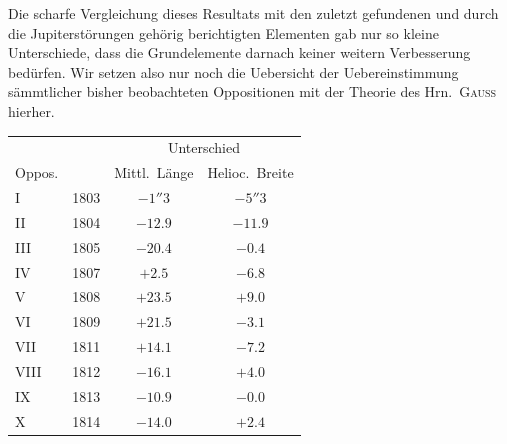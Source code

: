\par\indent Die scharfe Vergleichung dieses Resultats mit den zuletzt gefundenen und durch die Jupiterstörungen gehörig berichtigten Elementen gab nur so kleine Unterschiede, dass die Grundelemente darnach keiner weitern Verbesserung bedürfen. Wir setzen also nur noch die Uebersicht der Uebereinstimmung sämmtlicher bisher beobachteten Oppositionen mit der Theorie des Hrn.\ \textsc{Gauss} hierher.

\begin{center}
\fontsize{10}{12}\selectfont\setlength{\tabcolsep}{5pt}\renewcommand{\arraystretch}{1.15}\begin{tabular}{ll|cc}
 & & \multicolumn{2}{c}{Unterschied} \\
Oppos. & & Mittl.\ Länge & Helioc.\ Breite \\
\hline
I & 1803 & $-1''3$ & $-5''3$ \\
II & 1804 & $-12.9$ & $-11.9$ \\
III & 1805 & $-20.4$ & $-0.4$ \\
IV & 1807 & $+2.5$ & $-6.8$ \\
V & 1808 & $+23.5$ & $+9.0$ \\
VI & 1809 & $+21.5$ & $-3.1$ \\
VII & 1811 & $+14.1$ & $-7.2$ \\
VIII & 1812 & $-16.1$ & $+4.0$ \\
IX & 1813 & $-10.9$ & $-0.0$ \\
X & 1814 & $-14.0$ & $+2.4$ \\
\end{tabular}
\end{center}
